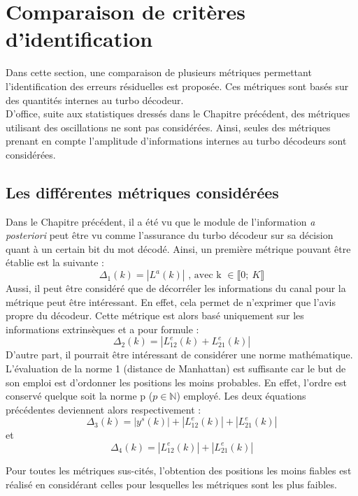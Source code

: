 \section{Comparaison de critères d'identification}
Dans cette section, une comparaison de plusieurs métriques permettant l'identification des erreurs résiduelles est 
proposée. Ces métriques sont basés sur des quantités internes au turbo décodeur.\\
D'office, suite aux statistiques dressés dans le Chapitre précédent, des métriques utilisant des oscillations ne sont 
pas considérées. Ainsi, seules des métriques prenant en compte l'amplitude d'informations internes au turbo décodeurs 
sont considérées.

\subsection{Les différentes métriques considérées}
Dans le Chapitre précédent, il a été vu que le module de l'information \textit{a posteriori} peut être vu comme 
l'assurance du turbo décodeur sur sa décision quant à un certain bit du mot décodé. Ainsi, un première métrique pouvant 
être établie est la suivante :
\begin{equation}
	\Delta_1(k) = |L^a(k)|\text{~, avec k~}\in \llbracket0;~K \rrbracket 
\end{equation}
Aussi, il peut être considéré que de décorréler les informations du canal pour la métrique peut être intéressant. En effet, 
cela permet de n'exprimer que l'avis propre du décodeur. Cette métrique est alors basé uniquement sur les informations 
extrinsèques et a pour formule : 
\begin{equation}
	\Delta_2(k) = |L^e_{12}(k)+L^e_{21}(k)|
\end{equation}
D'autre part, il pourrait être intéressant de considérer une norme mathématique. L'évaluation de la norme 1 (distance de
Manhattan) est suffisante car le but de son emploi est d'ordonner les positions les moins probables. En effet, l'ordre est 
conservé quelque soit la norme p ($p \in \mathbb{N} $) employé. Les deux équations précédentes deviennent alors respectivement :
\begin{equation}
	\Delta_3(k) = |y^s(k)| + |L^e_{12}(k)| + |L^e_{21}(k)|
\end{equation}
et 
\begin{equation}
	\Delta_4(k) = |L^e_{12}(k)| + |L^e_{21}(k)|
\end{equation}

Pour toutes les métriques sus-cités, l'obtention des positions les moins fiables est réalisé en considérant celles pour 
lesquelles les métriques sont les plus faibles.

